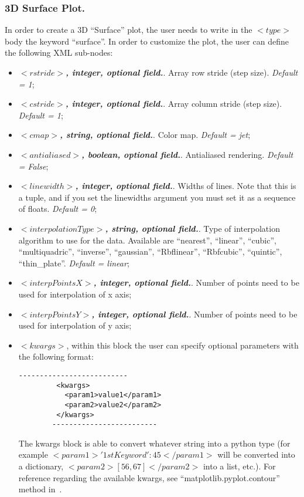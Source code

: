 \subsubsection{3D Surface Plot.}
In order to create a 3D ``Surface'' plot, the user needs to write in the $<type>$ body the keyword ``surface''. In order to customize the plot, the user can define the following XML sub-nodes:
  \begin{itemize}
     \item $<rstride>$\textbf{\textit{, integer, optional  field.}}. Array row stride (step size). \textit{Default = 1}; 
     \item $<cstride>$\textbf{\textit{, integer, optional  field.}}. Array column stride (step size). \textit{Default = 1};
     \item $<cmap>$\textbf{\textit{, string, optional  field.}}. Color map. \textit{Default = jet};
     \item $<antialiased>$\textbf{\textit{, boolean, optional  field.}}. Antialiased rendering. \textit{Default = False};
     \item $<linewidth>$\textbf{\textit{, integer, optional  field.}}. Widths of lines.  Note that this is a tuple, and if you set the linewidths argument you must set it as a sequence of floats. \textit{Default = 0}; 
     \item $<interpolationType>$\textbf{\textit{, string, optional  field.}}. Type of interpolation algorithm to use for the data. Available are ``nearest'', ``linear'', ``cubic'', ``multiquadric'', ``inverse'', ``gaussian'', ``Rbflinear'', ``Rbfcubic'', ``quintic'', ``thin\_plate''. \textit{Default = linear};
     \item $<interpPointsX>$\textbf{\textit{, integer, optional  field.}}. Number of points need to be used for interpolation of x axis;
     \item $<interpPointsY>$\textbf{\textit{, integer, optional  field.}}. Number of points need to be used for interpolation of y axis;
 \item \textit{$<kwargs>$},  within this block the user can specify optional parameters with the following format:
        \begin{lstlisting}[style=XML]
        --------------------------
         <kwargs>
           <param1>value1</param1>
           <param2>value2</param2>
         </kwargs>
        -------------------------
       \end{lstlisting}
         The kwargs block is able to convert whatever string into a python type (for example $<param1>{'1stKeyword':45}</param1>$ will be converted into a dictionary, $<param2>[56,67]</param2>$ into a list, etc.). For reference regarding the available kwargs, see ``matplotlib.pyplot.contour'' method in~\cite{MatPlotLib}.
    \end{itemize}

